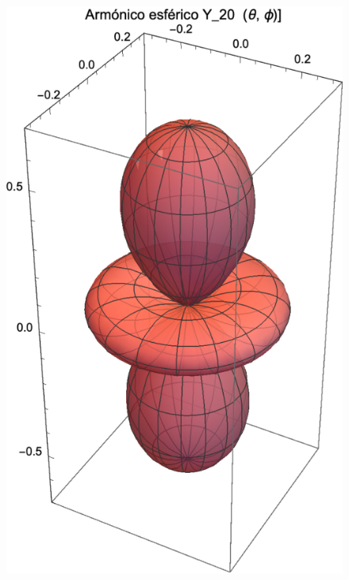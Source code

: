 \newpage
\begin{figure}[H]
    \centering
    \includegraphics[scale=1]{Imagenes/Armonicos_Esfericos_20.eps}
 

\end{figure}
